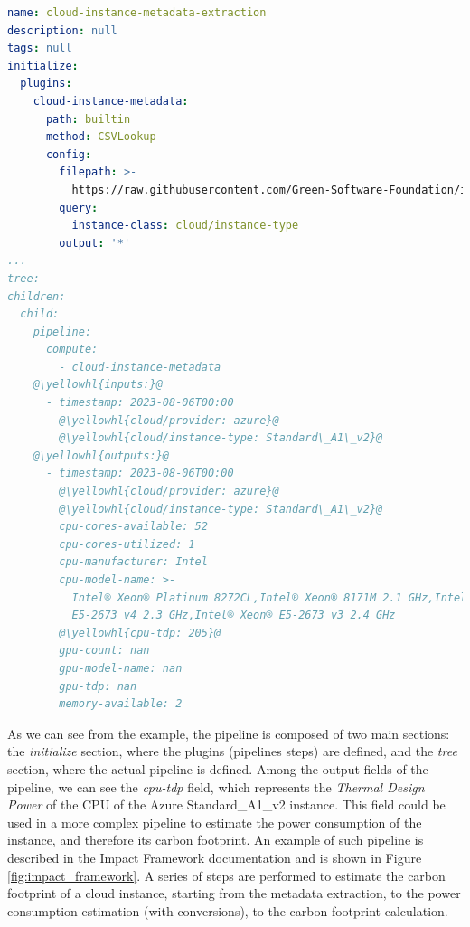 \begin{lstlisting}[language=yaml, caption={Cloud Metadata extraction example}, label={lst:cloud_metadata_example}]
name: cloud-instance-metadata-extraction
description: null
tags: null
initialize:
  plugins:
    cloud-instance-metadata:
      path: builtin
      method: CSVLookup
      config:
        filepath: >-
          https://raw.githubusercontent.com/Green-Software-Foundation/if-data/main/cloud-metdata-azure-instances.csv
        query:
          instance-class: cloud/instance-type
        output: '*'
...
tree:
children:
  child:
    pipeline:
      compute:
        - cloud-instance-metadata
    @\yellowhl{inputs:}@
      - timestamp: 2023-08-06T00:00
        @\yellowhl{cloud/provider: azure}@
        @\yellowhl{cloud/instance-type: Standard\_A1\_v2}@
    @\yellowhl{outputs:}@
      - timestamp: 2023-08-06T00:00
        @\yellowhl{cloud/provider: azure}@
        @\yellowhl{cloud/instance-type: Standard\_A1\_v2}@
        cpu-cores-available: 52
        cpu-cores-utilized: 1
        cpu-manufacturer: Intel
        cpu-model-name: >-
          Intel® Xeon® Platinum 8272CL,Intel® Xeon® 8171M 2.1 GHz,Intel® Xeon®
          E5-2673 v4 2.3 GHz,Intel® Xeon® E5-2673 v3 2.4 GHz
        @\yellowhl{cpu-tdp: 205}@
        gpu-count: nan
        gpu-model-name: nan
        gpu-tdp: nan
        memory-available: 2
\end{lstlisting}

As we can see from the example, the pipeline is composed of two main sections: the \textit{initialize} section, where the plugins (pipelines steps) are defined, and the \textit{tree} section, where the actual pipeline is defined.
Among the output fields of the pipeline, we can see the \textit{cpu-tdp} field, which represents the \textit{Thermal Design Power} of the CPU of the Azure Standard\_A1\_v2 instance.
This field could be used in a more complex pipeline to estimate the power consumption of the instance, and therefore its carbon footprint.
An example of such pipeline is described in the Impact Framework documentation \cite{impact_framework_pipeline} and is shown in Figure \ref{fig:impact_framework}.
A series of steps are performed to estimate the carbon footprint of a cloud instance, starting from the metadata extraction, to the power consumption estimation (with conversions), to the carbon footprint calculation.

\newpage

